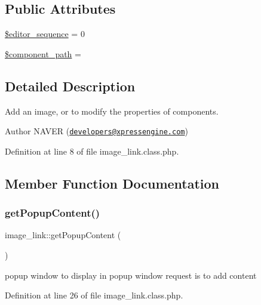 \subsection*{Public Attributes}
\begin{DoxyCompactItemize}
\item 
\hyperlink{classimage__link_af783692826f89b17fa6e9cf21d4f0f8b}{\$editor\+\_\+sequence} = 0
\item 
\hyperlink{classimage__link_ae68f572cbf4ce0aaa8ac20dd6b98a2f0}{\$component\+\_\+path} = \textquotesingle{}\textquotesingle{}
\end{DoxyCompactItemize}


\subsection{Detailed Description}
Add an image, or to modify the properties of components. 

\begin{DoxyAuthor}{Author}
N\+A\+V\+ER (\href{mailto:developers@xpressengine.com}{\tt developers@xpressengine.\+com}) 
\end{DoxyAuthor}


Definition at line 8 of file image\+\_\+link.\+class.\+php.



\subsection{Member Function Documentation}
\mbox{\label{classimage__link_a394ef807a2b750c5b3f0041eb7ab4aaf}} 
\subsubsection{\texorpdfstring{get\+Popup\+Content()}{getPopupContent()}}
{\footnotesize\ttfamily image\+\_\+link\+::get\+Popup\+Content (\begin{DoxyParamCaption}{ }\end{DoxyParamCaption})}



popup window to display in popup window request is to add content 



Definition at line 26 of file image\+\_\+link.\+class.\+php.

